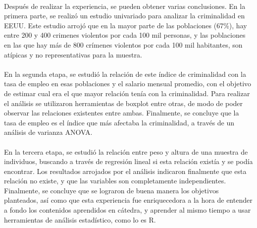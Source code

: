 \paragraph{}
Despu\'{e}s de realizar la experiencia, se pueden obtener varias conclusiones. En la primera parte, se realiz\'{o} un estudio univariado para analizar la criminalidad en EEUU. Este estudio arroj\'{o} que en la mayor parte de las poblaciones (67\%),  hay entre 200 y 400 crimenes violentos por cada 100 mil personas, y las poblaciones en las que hay m\'{a}s de 800 cr\'{i}menes violentos por cada 100 mil habitantes, son at\'{i}picas y no representativas para la muestra.
\\ \\
En la segunda etapa, se estudi\'{o} la relaci\'{o}n de este \'{i}ndice de criminalidad con la tasa de empleo en esas poblaciones y el salario mensual promedio, con el objetivo de estimar cual era el que mayor relaci\'{o}n ten\'{i}a con la criminalidad. Para realizar el an\'{a}lisis se utilizaron herramientas de boxplot entre otras, de modo de poder observar las relaciones existentes entre ambas. Finalmente, se concluye que la tasa de empleo es el \'{i}ndice que m\'{a}s afectaba la criminalidad, a trav\'{e}s de un an\'{a}lisis de varianza ANOVA.
\\ \\
En la tercera etapa, se estudi\'{o} la relaci\'{o}n entre peso y altura de una muestra de individuos, buscando a trav\'{e}s de regresi\'{o}n lineal si esta relaci\'{o}n exist\'{i}a y se pod\'{i}a encontrar. Los resultados arrojados por el an\'{a}lisis indicaron finalmente que esta relaci\'{o}n no existe, y que las variables son completamente independientes.
Finalmente, se concluye que se lograron de buena manera los objetivos planteados, as\'{i} como que esta experiencia fue enriquecedora a la hora de entender a fondo los contenidos aprendidos en c\'{a}tedra, y aprender al mismo tiempo a usar herramientas de an\'{a}lisis estad\'{i}stico, como lo es R.
